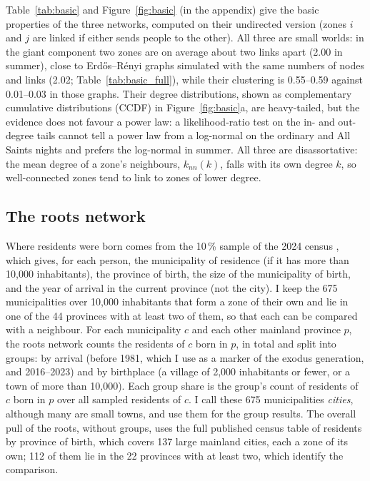 Table~\ref{tab:basic} and Figure~\ref{fig:basic} (in the appendix) give the basic properties of the three networks, computed on their undirected version (zones $i$ and $j$ are linked if either sends people to the other). All three are small worlds: in the giant component two zones are on average about two links apart (2.00 in summer), close to Erd\H{o}s--R\'enyi graphs simulated with the same numbers of nodes and links (2.02; Table~\ref{tab:basic_full}), while their clustering is 0.55--0.59 against 0.01--0.03 in those graphs. Their degree distributions, shown as complementary cumulative distributions (CCDF) in Figure~\ref{fig:basic}a, are heavy-tailed, but the evidence does not favour a power law: a likelihood-ratio test on the in- and out-degree tails \citep{clauset2009power} cannot tell a power law from a log-normal on the ordinary and All Saints nights and prefers the log-normal in summer. All three are disassortative: the mean degree of a zone's neighbours, $k_{nn}(k)$, falls with its own degree $k$, so well-connected zones tend to link to zones of lower degree.




\subsection{The roots network}

Where residents were born comes from the 10\,\% sample of the 2024 census \citep{ine2025censo}, which gives, for each person, the municipality of residence (if it has more than 10,000 inhabitants), the province of birth, the size of the municipality of birth, and the year of arrival in the current province (not the city). I keep the 675 municipalities over 10,000 inhabitants that form a zone of their own and lie in one of the 44 provinces with at least two of them, so that each can be compared with a neighbour. For each municipality $c$ and each other mainland province $p$, the roots network counts the residents of $c$ born in $p$, in total and split into groups: by arrival (before 1981, which I use as a marker of the exodus generation, and 2016--2023) and by birthplace (a village of 2,000 inhabitants or fewer, or a town of more than 10,000). Each group share is the group's count of residents of $c$ born in $p$ over all sampled residents of $c$. I call these 675 municipalities \emph{cities}, although many are small towns, and use them for the group results. The overall pull of the roots, without groups, uses the full published census table of residents by province of birth, which covers 137 large mainland cities, each a zone of its own; 112 of them lie in the 22 provinces with at least two, which identify the comparison.

